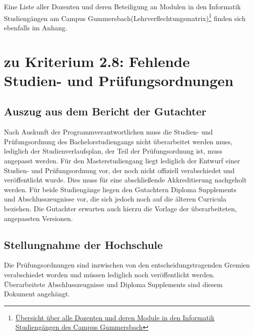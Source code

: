 Eine Liste aller Dozenten und deren Beteiligung an Modulen in den
Informatik Studiengängen am Campus
Gummersbach(Lehrverflechtungsmatrix)\footnote{\href{https://th-koeln.github.io/mi-2017/anhaenge/stellungsnahme/dozenten-und-module-2017.pdf}{Übersicht
  über alle Dozenten und deren Module in den Informatik Studiengängen
  des Campus Gummersbach}} finden sich ebenfalls im Anhang.

\section{zu Kriterium 2.8: Fehlende Studien- und
Prüfungsordnungen\label{/mi-2017/selbstbericht/stellungnahme/0000-stellungnahme}}\label{zu-kriterium-2.8-fehlende-studien--und-pruxfcfungsordnungenpathlabelmi-2017selbstberichtstellungnahme0000-stellungnahme}

\subsection{Auszug aus dem Bericht der
Gutachter\label{/mi-2017/selbstbericht/stellungnahme/0000-stellungnahme}}\label{auszug-aus-dem-bericht-der-gutachterpathlabelmi-2017selbstberichtstellungnahme0000-stellungnahme-6}

\begin{siderules}
Nach Auskunft der Programmverantwortlichen muss die Studien- und
Prüfungsordnung des Bachelorstudiengangs nicht überarbeitet werden muss,
lediglich der Studienverlaufsplan, der Teil der Prüfungsordnung ist,
muss angepasst werden. Für den Masterstudiengang liegt lediglich der
Entwurf einer Studien- und Prüfungsordnung vor, der noch nicht offiziell
verabschiedet und veröffentlicht wurde. Dies muss für eine abschließende
Akkreditierung nachgeholt werden. Für beide Studiengänge liegen den
Gutachtern Diploma Supplements und Abschlusszeugnisse vor, die sich
jedoch noch auf die älteren Curricula beziehen. Die Gutachter erwarten
auch hierzu die Vorlage der überarbeiteten, angepassten Versionen.
\end{siderules}

\subsection{Stellungnahme der
Hochschule\label{/mi-2017/selbstbericht/stellungnahme/0000-stellungnahme}}\label{stellungnahme-der-hochschulepathlabelmi-2017selbstberichtstellungnahme0000-stellungnahme-5}

Die Prüfungsordnungen sind inzwischen von den entscheidungstragenden
Gremien verabschiedet worden und müssen lediglich noch veröffentlicht
werden. Überarbeitete Abschlusszeugnisse und Diploma Supplements sind
diesem Dokument angehängt.

